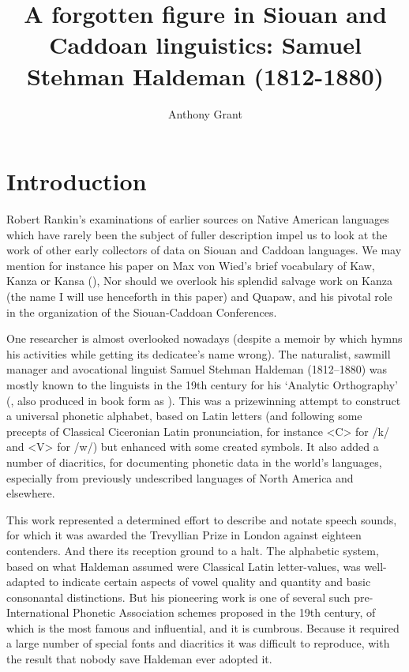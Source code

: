 \documentclass[output=paper]{LSP/langsci}
\author{Anthony Grant}
\title{A forgotten figure in Siouan and Caddoan linguistics:  Samuel Stehman Haldeman (1812-1880)}
\begin{document}
\section{Introduction}

Robert Rankin's examinations of earlier sources on Native American languages which have rarely been the subject of fuller description impel us to look at the work of other early collectors of data on Siouan and Caddoan languages. We may mention for instance his paper on Max von Wied's \citeyearpar{Maximilian18391841} brief vocabulary of Kaw, Kanza or Kansa  (\citealt{Rankin1994}), Nor should we overlook his splendid salvage work on Kanza (the name I will use henceforth in this paper) and Quapaw, and his pivotal role in the organization of the Siouan-Caddoan Conferences.

One researcher is almost overlooked nowadays (despite a memoir by \citealt{Lesley1881} which hymns his activities while getting its dedicatee's name wrong). The naturalist, sawmill manager and avocational linguist Samuel Stehman Haldeman (1812--1880)  was mostly known to the linguists in the 19th century for his `Analytic Orthography' (\citealt{Haldeman1859}, also produced in book form as \citealt{Haldeman1860}). This was a prizewinning attempt to construct a  universal phonetic alphabet, based on Latin letters (and following some precepts of Classical Ciceronian Latin pronunciation, for instance <C> for /k/ and <V> for /w/) but enhanced with some created symbols. It also added a number of diacritics,  for documenting phonetic data in the world's languages, especially from previously undescribed languages of North America and elsewhere.  

This work represented a determined effort to describe and notate speech sounds, for which it was awarded the Trevyllian Prize in London against eighteen contenders. And there its reception ground to a halt. The alphabetic system, based on what Haldeman assumed were Classical Latin letter-values,  was well-adapted to indicate certain aspects of vowel quality and quantity and basic consonantal distinctions. But his pioneering work is one of several such pre-International Phonetic Association  schemes proposed in the 19th century, of which \citet{Lepsius1863} is the most famous and influential, and it is cumbrous.  Because it required a large number of special fonts and diacritics it was difficult to reproduce, with the result that nobody save Haldeman ever adopted it.    
\end{document}
